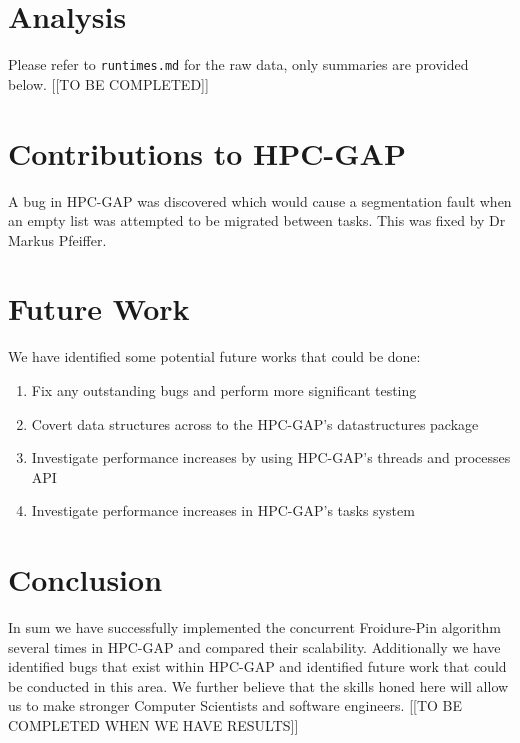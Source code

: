 \documentclass{report}
\begin{document}
\section*{Analysis}
Please refer to \texttt{runtimes.md} for the raw data, only summaries are provided below.
[[TO BE COMPLETED]]

\section*{Contributions to HPC-GAP}
A bug in HPC-GAP was discovered which would cause a segmentation fault when an empty list was attempted to be migrated between tasks.
This was fixed by Dr Markus Pfeiffer\cite{hpcsol}.

\section*{Future Work}
We have identified some potential future works that could be done:

\begin{enumerate}
\item Fix any outstanding bugs and perform more significant testing
\item Covert data structures across to the HPC-GAP's datastructures package\cite{ds}
\item Investigate performance increases by using HPC-GAP's threads and processes API
\item Investigate performance increases in HPC-GAP's tasks system
\end{enumerate}

\section*{Conclusion}
In sum we have successfully implemented the concurrent Froidure-Pin algorithm several times in HPC-GAP and compared their scalability.
Additionally we have identified bugs that exist within HPC-GAP and identified future work that could be conducted in this area.
\newline
We further believe that the skills honed here will allow us to make stronger Computer Scientists and software engineers.
[[TO BE COMPLETED WHEN WE HAVE RESULTS]]



\end{document}
